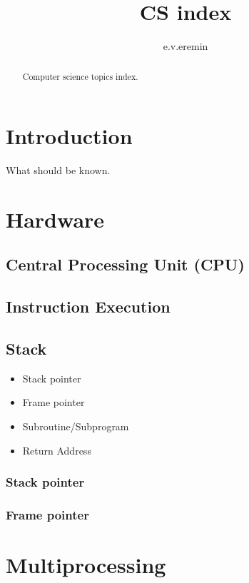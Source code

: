 \documentclass{article}
\begin{document}
\title{CS index}
\author{e.v.eremin}

\maketitle

\begin{abstract}
Computer science topics index.
\end{abstract}

\section{Introduction}

What should be known.

\section{Hardware}

\subsection{Central Processing Unit (CPU)}

\subsection{Instruction Execution}

\subsection{Stack}

\begin{itemize}
\item Stack pointer
\item Frame pointer
\item Subroutine/Subprogram
\item Return Address
\end{itemize}

\subsubsection{Stack pointer}

\subsubsection{Frame pointer}

\section{Multiprocessing}
\end{document}
